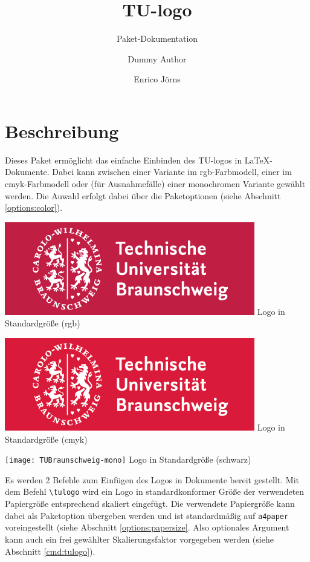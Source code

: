 \documentclass{scrartcl}
\title{TU-logo}
\subtitle{Paket-Dokumentation}
\author{Dummy Author \and Enrico Jörns}
\begin{document}
\maketitle

\section{Beschreibung}

Dieses Paket ermöglicht das einfache Einbinden des TU-logos in \LaTeX-Dokumente.
Dabei kann zwischen einer Variante im rgb-Farbmodell, einer im
cmyk-Farbmodell oder (für Ausnahmefälle) einer monochromen Variante gewählt
werden. Die Auwahl erfolgt dabei über die Paketoptionen
(siehe Abschnitt \ref{options:color}).

\begin{minipage}{0.5\textwidth}
  \centering
  \includegraphics[width=\tulogoBaseWidth]{TUBraunschweig-rgb}
  {\sffamily Logo in Standardgröße (rgb)}
\end{minipage}
\begin{minipage}{0.5\textwidth}
  \centering
  \includegraphics[width=\tulogoBaseWidth]{TUBraunschweig-cmyk}
  {\sffamily Logo in Standardgröße (cmyk)}
\end{minipage}

\begin{minipage}{0.5\textwidth}
  \centering
  \texttt{[image: TUBraunschweig-mono]}
  {\sffamily Logo in Standardgröße (schwarz)}
\end{minipage}

Es werden 2 Befehle zum Einfügen des Logos in Dokumente bereit gestellt.
Mit dem Befehl {\color{tuRed}\lstinline{\tulogo}} wird ein Logo in
standardkonformer Größe der verwendeten Papiergröße entsprechend skaliert
eingefügt. Die verwendete Papiergröße kann dabei als Paketoption übergeben
werden und ist standardmäßig auf \lstinline{a4paper} voreingestellt
(siehe Abschnitt \ref{options:papersize}.
Also optionales Argument kann auch ein frei gewählter Skalierungsfaktor
vorgegeben werden (siehe Abschnitt \ref{cmd:tulogo}).
\end{document}
